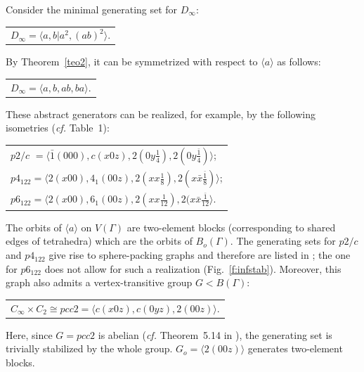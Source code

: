 \documentclass[11pt,a4paper]{article}
\begin{document}
\noindent Consider the minimal generating set for $D_{\infty}$:

\begin{center}
\begin{tabular}{l}
$D_{\infty} = \langle a, b | a^2, (ab)^2 \rangle$.\\
\end{tabular}
\end{center}

\noindent By Theorem~\ref{teo2}, it can be symmetrized with respect to $\langle a \rangle$ as follows:

\begin{center}
\begin{tabular}{l}
$D_{\infty} = \langle a, b, ab, ba \rangle$.\\
\end{tabular}
\end{center}

\noindent These abstract generators can be realized, for example, by the following isometries (\emph{cf.} Table~1):

\begin{center}
\begin{tabular}{l}
$p2/c  \, \, =  \langle \bar1(000), c(x0z), 2(0y\frac{1}{4}), 2(0y\frac{\bar1}{4}) \rangle$;\\
$p4_122 = \langle 2(x00), 4_1(00z), 2(xx\frac{1}{8}), 2(x\bar{x}\frac{\bar1}{8}) \rangle$;\\
$p6_122 = \langle 2(x00), 6_1(00z), 2(xx\frac{1}{12}), 2(x\bar{x}\frac{\bar1}{12} \rangle$.
\end{tabular}
\end{center}


\noindent The orbits of $\langle a \rangle $ on $V(\Gamma)$ are two-element blocks (corresponding to shared edges of tetrahedra) which are the orbits of $B_o(\Gamma)$. The generating sets for $p2/c$ and $p4_122$ give rise to sphere-packing graphs and therefore are listed in \cite{KF78}; the one for $p6_122$  does not allow for such a realization (Fig.~\ref{f:infstab}). Moreover, this graph also admits a vertex-transitive group $G < B(\Gamma)$:

\begin{center}
\begin{tabular}{l}
$C_{\infty} \times C_2 \cong pcc2 = \langle c(x0z), c(0yz), 2(00z) \rangle$. %
\end{tabular}
\end{center}

\noindent Here, since $G = pcc2$ is abelian (\emph{cf.} Theorem~5.14 in \cite{Jung84}), the generating set is trivially stabilized by the whole group. $G_o = \langle 2(00z) \rangle$ generates two-element blocks.
\end{document}
